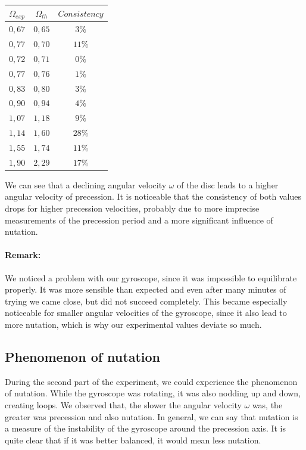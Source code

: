 \documentclass{scrartcl}
\begin{document}
\centering
\begin{tabular}{|c|c|c|}
    \hline
    $\Omega_{exp}$ & $\Omega_{th}$ & $Consistency$ \\
    \hline
   $0,67$ & $0,65$ & $3\%$  \\
   \hline
   $0,77$ & $0,70$ & $11\%$ \\
   \hline
   $0,72$ & $0,71$ & $0\%$ \\
   \hline
   $0,77$ & $0,76$ & $1\%$\\
   \hline
   $0,83$ & $0,80$ & $3\%$\\
   \hline
   $0,90$ & $0,94$ & $4\%$ \\
   \hline
   $1,07$ & $1,18$ & $9\%$\\
   \hline
   $1,14$ & $1,60$ & $28\%$\\
   \hline
   $1,55$ & $1,74$ & $11\%$\\
   \hline
   $1,90$ & $2,29$ & $17\%$\\
   \hline
\end{tabular}
\medskip
\flushleft
We can see that a declining angular velocity $\omega$ of the disc leads to a higher angular velocity of precession. It is noticeable that the consistency of both values drops for higher precession velocities, probably due to more imprecise measurements of the precession period and a more significant influence of nutation.
\medskip
\paragraph{Remark:}
\medskip
We noticed a problem with our gyroscope, since it was impossible to equilibrate properly. It was more sensible than expected and even after many minutes of trying we came close, but did not succeed completely. This became especially noticeable for smaller angular velocities of the gyroscope, since it also lead to more nutation, which is why our experimental values deviate so much.






\subsection{Phenomenon of nutation}

During the second part of the experiment, we could experience the phenomenon of nutation. While the gyroscope was rotating, it was also nodding up and down, creating loops. We observed that, the slower the angular velocity $\omega$ was, the greater was precession and also nutation. In general, we can say that nutation is a measure of the instability of the gyroscope around the precession axis. It is quite clear that if it was better balanced, it would mean less nutation.
\medskip
\end{document}
